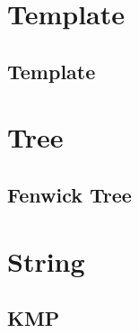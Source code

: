 \section{Template}
\subsection{Template}
\raggedbottom
\hrulefill
\section{Tree}
\subsection{Fenwick Tree}
\raggedbottom
\hrulefill
\section{String}
\subsection{KMP}
\raggedbottom
\hrulefill
\pagebreak

